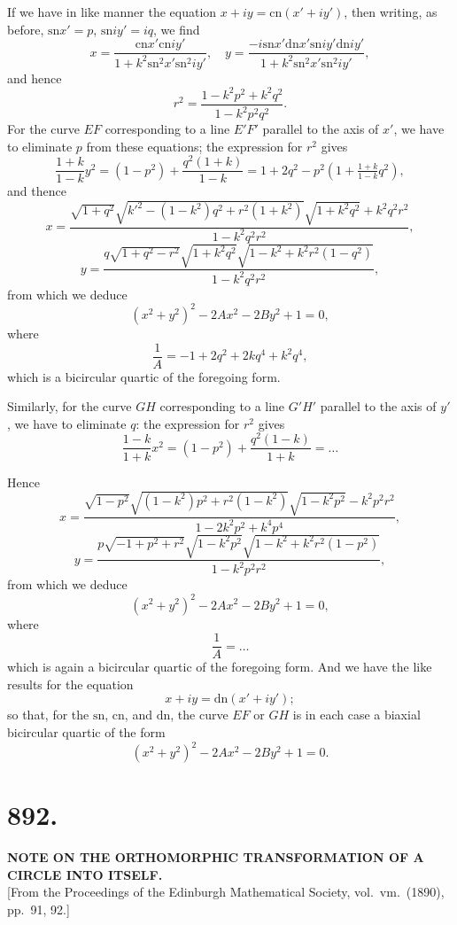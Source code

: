 \documentclass[11pt,a4paper]{book}
\providecommand{\sn}{\mathrm{sn}}
\providecommand{\cn}{\mathrm{cn}}
\providecommand{\dn}{\mathrm{dn}}
\begin{document}
If we have in like manner the equation $x + iy = \cn(x' + iy')$, then writing, as before, $\sn x' = p$, $\sn iy' = iq$, we find
\[
x = \frac{\cn x' \cn iy'}{1 + k^2 \sn^2 x' \sn^2 iy'},\quad y = \frac{-i\sn x' \dn x' \sn iy' \dn iy'}{1 + k^2 \sn^2 x' \sn^2 iy'},
\]
and hence
\[
r^2 = \frac{1 - k^2p^2 + k^2q^2}{1 - k^2p^2q^2}.
\]
For the curve $EF$ corresponding to a line $E'F'$ parallel to the axis of $x'$, we have to eliminate $p$ from these equations; the expression for $r^2$ gives
\[
\frac{1+k}{1-k}y^2 = (1-p^2) + \frac{q^2(1+k)}{1-k} = 1 + 2q^2 - p^2(1+\tfrac{1+k}{1-k}q^2),
\]
and thence
\[
x = \frac{\sqrt{1+q^2}\sqrt{k'^2-(1-k^2)q^2+r^2(1+k^2)}\sqrt{1+k^2q^2}+k^2q^2r^2}{1-k^2q^2r^2},
\]
\[
y = \frac{q\sqrt{1+q^2-r^2}\sqrt{1+k^2q^2}\sqrt{1-k^2+k^2r^2(1-q^2)}}{1-k^2q^2r^2},
\]
from which we deduce
\[
(x^2+y^2)^2 - 2Ax^2 - 2By^2 + 1 = 0,
\]
where
\[
\frac{1}{A} = -1 + 2q^2 + 2kq^4 + k^2q^4,
\]
which is a bicircular quartic of the foregoing form.

Similarly, for the curve $GH$ corresponding to a line $G'H'$ parallel to the axis of $y'$, we have to eliminate $q$: the expression for $r^2$ gives
\[
\frac{1-k}{1+k}x^2 = (1-p^2) + \frac{q^2(1-k)}{1+k} = \ldots
\]

Hence
\[
x = \frac{\sqrt{1-p^2}\sqrt{(1-k^2)p^2+r^2(1-k^2)}\sqrt{1-k^2p^2}-k^2p^2r^2}{1-2k^2p^2+k^4p^4},
\]
\[
y = \frac{p\sqrt{-1+p^2+r^2}\sqrt{1-k^2p^2}\sqrt{1-k^2+k^2r^2(1-p^2)}}{1-k^2p^2r^2},
\]
from which we deduce
\[
(x^2+y^2)^2 - 2Ax^2 - 2By^2 + 1 = 0,
\]
where
\[
\frac{1}{A} = \ldots
\]
which is again a bicircular quartic of the foregoing form. And we have the like results for the equation
\[
x + iy = \dn(x' + iy');
\]
so that, for the $\sn$, $\cn$, and $\dn$, the curve $EF$ or $GH$ is in each case a biaxial bicircular quartic of the form
\[
(x^2+y^2)^2 - 2Ax^2 - 2By^2 + 1 = 0.
\]


\section*{892.}
\begin{center}
{\large\bfseries NOTE ON THE ORTHOMORPHIC TRANSFORMATION OF A CIRCLE INTO ITSELF.}\\[0.5em]
\small [From the Proceedings of the Edinburgh Mathematical Society, vol.\ vm.\ (1890), pp.\ 91, 92.]
\end{center}
\end{document}
